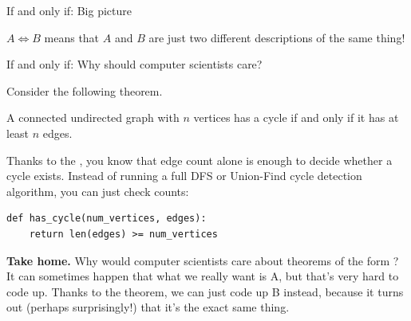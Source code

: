 \documentclass[10pt]{beamer}
\begin{document}
\begin{frame}{If and only if: Big picture}

 $A \iff B$  means that $A$ and $B$ are just two different descriptions of the same thing!
 	
\end{frame}


\begin{frame}[fragile]{If and only if: Why should computer scientists care?}

Consider the following theorem.
\vfill 
\begin{mygreenbox}[title=\textbf{Theorem (Graph Theory)}]
A connected undirected graph with $n$ vertices has a cycle if and only if it has at least $n$ edges.	
\end{mygreenbox}
\vfill 

Thanks to the , you know that edge count alone is enough to decide whether a cycle exists.  Instead of running a full DFS or Union-Find cycle detection algorithm, you can just check counts:

\vfill 

\begin{lstlisting}
def has_cycle(num_vertices, edges):
    return len(edges) >= num_vertices
\end{lstlisting}

\vfill \pause 

\colorbox{red!30}{\textbf{Take home.}}  Why would computer scientists care about theorems of the  form ?  It can sometimes happen that what we really want is A, but that’s very hard to code up.  Thanks to the theorem, we can just code up B instead, because it turns out (perhaps surprisingly!) that it's the exact same thing.
\end{frame}
\end{document}

